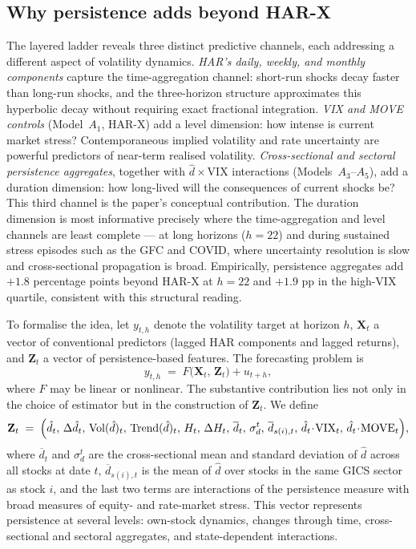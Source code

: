 \documentclass[11pt,a4paper]{article}
\newcommand{\VIX}{\mathrm{VIX}}
\newcommand{\dhat}{\hat d}
\begin{document}
\subsection*{Why persistence adds beyond HAR-X}

The layered ladder reveals three distinct predictive channels, each
addressing a different aspect of volatility dynamics. \emph{HAR's
daily, weekly, and monthly components} capture the time-aggregation
channel: short-run shocks decay faster than long-run shocks, and the
three-horizon structure approximates this hyperbolic decay without
requiring exact fractional integration. \emph{VIX and MOVE controls}
(Model~$A_1$, HAR-X) add a level dimension: how intense is current
market stress? Contemporaneous implied volatility and rate uncertainty
are powerful predictors of near-term realised volatility.
\emph{Cross-sectional and sectoral persistence aggregates}, together
with $\hat d \times \mathrm{VIX}$ interactions (Models~$A_3$--$A_5$),
add a duration dimension: how long-lived will the consequences of
current shocks be? This third channel is the paper's conceptual
contribution. The duration dimension is most informative precisely
where the time-aggregation and level channels are least complete ---
at long horizons ($h=22$) and during sustained stress episodes such as
the GFC and COVID, where uncertainty resolution is slow and
cross-sectional propagation is broad. Empirically, persistence aggregates
add $+1.8$ percentage points beyond HAR-X at $h=22$ and $+1.9$ pp in
the high-VIX quartile, consistent with this structural reading.

To formalise the idea, let $y_{t,h}$ denote the volatility target at
horizon $h$, $\mathbf X_t$ a vector of conventional predictors (lagged
HAR components and lagged returns), and $\mathbf Z_t$ a vector of
persistence-based features. The forecasting problem is
\begin{equation}
  y_{t,h} \;=\; F\!\bigl(\mathbf X_t,\, \mathbf Z_t\bigr) + u_{t+h},
\end{equation}
where $F$ may be linear or nonlinear. The substantive contribution lies
not only in the choice of estimator but in the construction of
$\mathbf Z_t$. We define
\begin{equation}
\mathbf Z_t \;=\; \Bigl(
  \dhat_t,\,\Delta\dhat_t,\,\mathrm{Vol}(\dhat)_t,\,\mathrm{Trend}(\dhat)_t,\,
  H_t,\,\Delta H_t,\,
  \overline{d}_t,\,\sigma_d^t,\,\overline{d}_{s(i),t},\,
  \dhat_t\!\cdot\!\VIX_t,\,\dhat_t\!\cdot\!\mathrm{MOVE}_t
\Bigr),
\end{equation}
where $\overline d_t$ and $\sigma_d^t$ are the cross-sectional mean and
standard deviation of $\dhat$ across all stocks at date $t$,
$\overline d_{s(i),t}$ is the mean of $\dhat$ over stocks in the same
GICS sector as stock $i$, and the last two terms are interactions of the
persistence measure with broad measures of equity- and rate-market
stress. This vector represents persistence at several levels: own-stock
dynamics, changes through time, cross-sectional and sectoral
aggregates, and state-dependent interactions.
\end{document}
